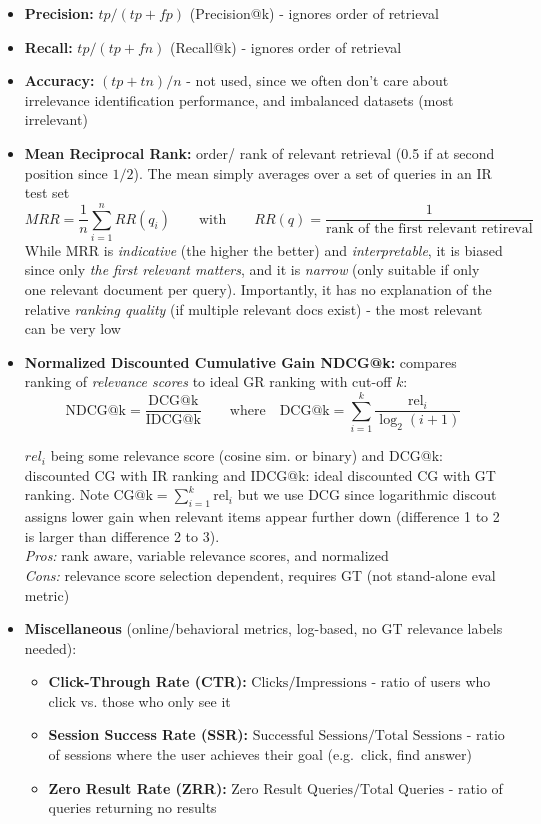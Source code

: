 \documentclass{article}
\begin{document}
\begin{itemize}
    \item \textbf{Precision:} $tp/(tp+fp)$ (Precision@k) - ignores order of retrieval
    \item \textbf{Recall:} $tp/(tp+fn)$ (Recall@k) - ignores order of retrieval
    \item \textbf{Accuracy:} $(tp+tn)/n$ - not used, since we often don't care about irrelevance identification performance, and imbalanced datasets (most irrelevant)
    
    \item \textbf{Mean Reciprocal Rank:} order/ rank of relevant retrieval (0.5 if at second position since $1/2$). The mean simply averages over a set of queries in an IR test set
    $$
    MRR = \frac{1}{n}\sum^n_{i=1}RR(q_i) \qquad \text{with}\qquad RR(q) = \frac{1}{\text{rank of the first relevant retireval}}
    $$
    While MRR is \textit{indicative} (the higher the better) and \textit{interpretable}, it is biased since only \textit{the first relevant matters}, and it is \textit{narrow} (only suitable if only one relevant document per query). Importantly, it has no explanation of the relative \textit{ranking quality} (if multiple relevant docs exist) - the most relevant can be very low
    
    \item \textbf{Normalized Discounted Cumulative Gain NDCG@k:} compares ranking of \textit{relevance scores} to ideal GR ranking with cut-off $k$:
    $$
    \text{NDCG@k} = \frac{\text{DCG@k}}{\text{IDCG@k}} \qquad \text{where} \quad \text{DCG@k}=\sum^k_{i=1}\frac{\text{rel}_i}{\log_2(i+1)}\
    $$

    $rel_i$ being some relevance score (cosine sim. or binary) and DCG@k: discounted CG with IR ranking and IDCG@k: ideal discounted CG with GT ranking. Note $\text{CG@k}=\sum^k_{i=1}\text{rel}_i$ but we use DCG since logarithmic discout assigns lower gain when relevant items appear further down (difference 1 to 2 is larger than difference 2 to 3). \\

    \textit{Pros:} rank aware, variable relevance scores, and normalized\\
    \textit{Cons:} relevance score selection dependent, requires GT (not stand-alone eval metric)

    \item \textbf{Miscellaneous} (online/behavioral metrics, log-based, no GT relevance labels needed):
    \begin{itemize}
        \item \textbf{Click-Through Rate (CTR):} $\text{Clicks}/\text{Impressions}$ - ratio of users who click vs. those who only see it
        \item \textbf{Session Success Rate (SSR):} $\text{Successful Sessions}/\text{Total Sessions}$ - ratio of sessions where the user achieves their goal (e.g.\ click, find answer)
        \item \textbf{Zero Result Rate (ZRR):} $\text{Zero Result Queries}/\text{Total Queries}$ - ratio of queries returning no results
    \end{itemize}
\end{itemize}
\end{document}
